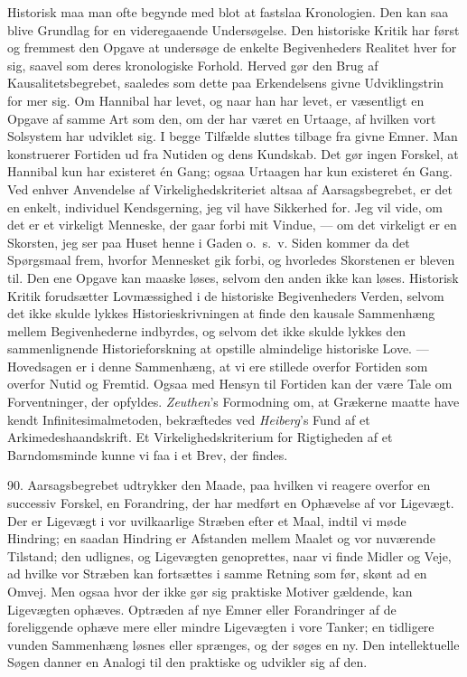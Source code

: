 \documentclass[12pt,a4paper]{book}
\newcommand{\opage}[1]{\marginnote{\footnotesize\textit{[#1]}}}
\newcommand{\apage}[1]{\marginnote{\footnotesize\textit{[#1]}}}
\begin{document}
Historisk maa man ofte begynde med blot at fastslaa Kronologien. Den kan saa
blive Grundlag for en videregaaende Undersøgelse. Den historiske Kritik har
først og fremmest den Opgave at undersøge de enkelte Begivenheders Realitet hver
for sig, saavel som deres kronologiske Forhold. Herved gør den Brug af
Kausalitetsbegrebet, saaledes som dette paa Erkendelsens givne Udviklingstrin
for%
\opage{211}mer sig. Om Hannibal har levet, og naar han har levet, er væsentligt en Opgave
af samme Art som den, om der har været en Urtaage, af hvilken vort Solsystem har
udviklet sig. I begge Tilfælde sluttes tilbage fra givne Emner. Man konstruerer
Fortiden ud fra Nutiden og dens Kundskab. Det gør ingen Forskel, at Hannibal kun
har existeret én Gang; ogsaa Urtaagen har kun existeret én Gang. Ved enhver
Anvendelse af Virkelighedskriteriet altsaa af Aarsagsbegrebet, er det en enkelt,
individuel Kendsgerning, jeg vil have Sikkerhed for. Jeg vil vide, om det er et
virkeligt Menneske, der gaar forbi mit Vindue, --- om det virkeligt er en Skorsten,
jeg ser paa Huset henne i Gaden o.\ s.\ v. Siden kommer da det Spørgsmaal frem,
hvorfor Mennesket gik forbi, og hvorledes Skorstenen er bleven til. Den ene
Opgave kan maaske løses, selvom den anden ikke kan løses. Historisk Kritik forudsætter Lovmæssighed i de historiske Begivenheders Verden,
selvom det ikke skulde lykkes Historieskrivningen at finde den kausale Sammenhæng
mellem Begivenhederne indbyrdes, og selvom det ikke skulde lykkes den
sammenlignende Historieforskning at opstille almindelige historiske Love. ---
Hovedsagen er i denne Sammenhæng, at vi ere stillede overfor Fortiden som overfor
Nutid og Fremtid. Ogsaa med Hensyn til Fortiden kan der være Tale om
Forventninger, der opfyldes. \emph{Zeuthen}'s Formodning om, at Grækerne maatte
have kendt Infinitesimalmetoden, bekræftedes ved \emph{Heiberg}'s Fund af et
Arkimedeshaandskrift. Et Virkelighedskriterium for Rigtigheden af et
Barndomsminde kunne vi faa i et Brev, der findes.

90. Aarsagsbegrebet udtrykker den Maade, paa hvilken vi reagere overfor en
successiv Forskel, en Forandring, der har medført en Ophævelse af vor Ligevægt.
Der er Ligevægt i vor uvilkaarlige Stræben efter et Maal, indtil vi møde
Hindring; en saadan Hindring er Afstanden mellem Maalet og vor nuværende Tilstand;
den udlignes, og Ligevægten genoprettes, naar vi finde Midler og Veje, ad hvilke
vor Stræben kan fortsættes i samme Retning som før, skønt ad en Omvej. Men ogsaa
hvor der ikke gør sig praktiske \apage{212} Motiver gældende, kan Ligevægten ophæves. Optræden
af nye Emner eller Forandringer af de foreliggende ophæve mere eller mindre
Ligevægten i vore Tanker; en tidligere vunden Sammenhæng løsnes eller sprænges, og
der søges en ny. Den intellektuelle Søgen danner en Analogi til den praktiske og
udvikler sig af den.
\end{document}
